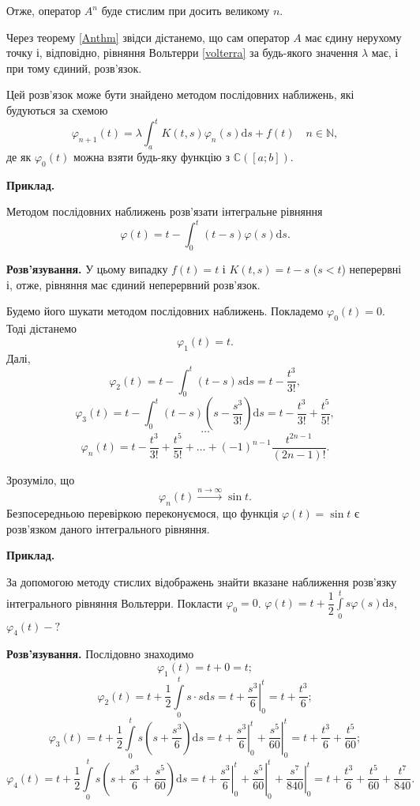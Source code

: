 \documentclass[14pt,twoside]{extreport}
\theoremstyle{mystyle}
\numberwithin{equation}{chapter}
\newcommand{\cab}{\mathbb{C}([a; b])}
\begin{document}
Отже, оператор $A^n$ буде стислим при досить великому $n$.

Через теорему \ref{Anthm} звідси дістанемо, що сам оператор $A$ має єдину нерухому точку і, відповідно, рівняння Вольтерри \eqref{volterra} за будь-якого значення $\lambda$ має, і при тому єдиний, розв'язок.

Цей розв'язок може бути знайдено методом послідовних наближень, які будуються за схемою
\[
 \varphi_{n+1}(t) = \lambda \int_{a}^{t} K(t, s) \varphi_n(s) \mathrm{d}s + f(t) \quad n\in\mathbb{N},
\]
де як $\varphi_0(t)$ можна взяти будь-яку функцію з $\cab$.

\begin{small}
\textbf{Приклад.}

Методом послідовних наближень розв'язати інтегральне рівняння
\[
 \varphi(t) = t - \int_{0}^{t} (t-s) \varphi(s) \mathrm{d}s.
\]

\textbf{Розв'язування.} У цьому випадку $f(t) = t$ і $K(t, s) = t-s$ ($s<t$) неперервні і, отже, рівняння має єдиний неперервний розв'язок.

Будемо його шукати методом послідовних наближень. Покладемо $\varphi_0(t) = 0$. Тоді дістанемо
\[
 \varphi_1(t) = t.
\]
Далі,
\[
 \varphi_2(t) = t - \int_{0}^{t} (t-s) s \mathrm{d}s = t - \dfrac{t^3}{3!},
\]
\[
 \varphi_3(t) = t - \int_{0}^{t} (t-s) \left(s- \dfrac{s^3}{3!}\right) \mathrm{d}s = t - \dfrac{t^3}{3!} + \dfrac{t^5}{5!},
\]
\[
 \ldots
\]
\[
 \varphi_n(t) = t - \dfrac{t^3}{3!} + \dfrac{t^5}{5!} + \ldots + (-1)^{n-1}\dfrac{t^{2n-1}}{(2n-1)!}.
\]

Зрозуміло, що
\[
 \varphi_n(t) \xrightarrow{n\to\infty} \sin t.
\]
Безпосередньою перевіркою переконуємося, що функція $\varphi(t) =\sin t$ є розв'язком даного інтегрального рівняння.

\textbf{Приклад.}

За допомогою методу стислих відображень знайти вказане наближення розв'язку інтегрального рівняння Вольтерри. Покласти $\varphi_0=0$. $\varphi(t) = t + \dfrac{1}{2}\int\limits_{0}^{t} s\varphi(s) \mathrm{d}s$, $\varphi_4(t) - ?$

\textbf{Розв'язування.}
Послідовно знаходимо
\[
\varphi_1(t) = t+0=t;
\]
\[
\varphi_2(t) = t + \dfrac{1}{2}\int\limits_{0}^{t} s \cdot s \mathrm{d}s = t + \left.\dfrac{s^3}{6}\right|_{0}^{t} = t+ \dfrac{t^3}{6};
\]
\[
\varphi_3(t) = t + \dfrac{1}{2}\int\limits_{0}^{t} s \left(s+ \dfrac{s^3}{6}\right) \mathrm{d}s = t + \left.\dfrac{s^3}{6}\right|_{0}^{t} + \left.\dfrac{s^5}{60}\right|_{0}^{t}= t+ \dfrac{t^3}{6} + \dfrac{t^5}{60};
\]
\[
\varphi_4(t) = t + \dfrac{1}{2}\int\limits_{0}^{t} s \left(s+ \dfrac{s^3}{6} + \dfrac{s^5}{60}\right) \mathrm{d}s = t + \left.\dfrac{s^3}{6}\right|_{0}^{t} + \left.\dfrac{s^5}{60}\right|_{0}^{t} + \left.\dfrac{s^7}{840}\right|_{0}^{t}= t+ \dfrac{t^3}{6} + \dfrac{t^5}{60} + \dfrac{t^7}{840}.
\]


\end{small}
\end{document}
